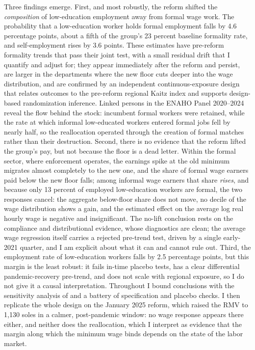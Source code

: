 Three findings emerge. First, and most robustly, the reform shifted the \emph{composition} of low-education employment away from formal wage work. The probability that a low-education worker holds formal employment falls by 4.6 percentage points, about a fifth of the group's 23 percent baseline formality rate, and self-employment rises by 3.6 points. These estimates have pre-reform formality trends that pass their joint test, with a small residual drift that I quantify and adjust for; they appear immediately after the reform and persist, are larger in the departments where the new floor cuts deeper into the wage distribution, and are confirmed by an independent continuous-exposure design that relates outcomes to the pre-reform regional Kaitz index and supports design-based randomization inference. Linked persons in the ENAHO Panel 2020--2024 reveal the flow behind the stock: incumbent formal workers were retained, while the rate at which informal low-educated workers entered formal jobs fell by nearly half, so the reallocation operated through the creation of formal matches rather than their destruction. Second, there is no evidence that the reform lifted the group's pay, but not because the floor is a dead letter. Within the formal sector, where enforcement operates, the earnings spike at the old minimum migrates almost completely to the new one, and the share of formal wage earners paid below the new floor falls; among informal wage earners that share \emph{rises}, and because only 13 percent of employed low-education workers are formal, the two responses cancel: the aggregate below-floor share does not move, no decile of the wage distribution shows a gain, and the estimated effect on the average log real hourly wage is negative and insignificant. The no-lift conclusion rests on the compliance and distributional evidence, whose diagnostics are clean; the average wage regression itself carries a rejected pre-trend test, driven by a single early-2021 quarter, and I am explicit about what it can and cannot rule out. Third, the employment rate of low-education workers falls by 2.5 percentage points, but this margin is the least robust: it fails in-time placebo tests, has a clear differential pandemic-recovery pre-trend, and does not scale with regional exposure, so I do not give it a causal interpretation. Throughout I bound conclusions with the sensitivity analysis of \citet{rambachan_roth_2023} and a battery of specification and placebo checks. I then replicate the whole design on the January 2025 reform, which raised the RMV to 1,130 soles in a calmer, post-pandemic window: no wage response appears there either, and neither does the reallocation, which I interpret as evidence that the margin along which the minimum wage binds depends on the state of the labor market.

